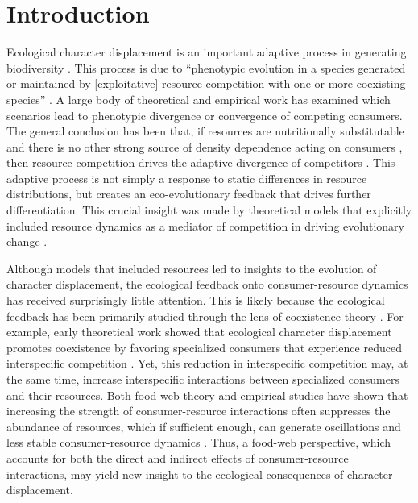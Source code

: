 \documentclass[11pt,]{article}
\begin{document}
\newpage

\section{Introduction}\label{introduction}

Ecological character displacement is an important adaptive process in
generating biodiversity \citep{Schluter2000, Pfennig2010}. This process
is due to ``phenotypic evolution in a species generated or maintained by
{[}exploitative{]} resource competition with one or more coexisting
species'' \citep{Schluter2000}. A large body of theoretical
\citep[e.g.][]{Lawlor1976, Abrams1986, Doebeli1996, Taper1985, McPeek2019}
and empirical \citep[reviewed
in:][]{Schluter2000, Dayan2005, Stuart2013} work has examined which
scenarios lead to phenotypic divergence or convergence of competing
consumers. The general conclusion has been that, if resources are
nutritionally substitutable \citep{Abrams1987, Fox2008} and there is no
other strong source of density dependence acting on consumers
\citep{Abrams1986}, then resource competition drives the adaptive
divergence of competitors \citep{Lawlor1976, Taper1985}. This adaptive
process is not simply a response to static differences in resource
distributions, but creates an eco-evolutionary feedback that drives
further differentiation. This crucial insight was made by theoretical
models that explicitly included resource dynamics as a mediator of
competition in driving evolutionary change
\citep{Lawlor1976, Abrams1986, Taper1985}.

Although models that included resources led to insights to the evolution
of character displacement, the ecological feedback onto
consumer-resource dynamics has received surprisingly little attention.
This is likely because the ecological feedback has been primarily
studied through the lens of coexistence theory
\citep{Lawlor1976, Germain2018, Bassar2017, McPeek2019}. For example,
early theoretical work showed that ecological character displacement
promotes coexistence by favoring specialized consumers that experience
reduced interspecific competition \citep{Lawlor1976}. Yet, this
reduction in interspecific competition may, at the same time, increase
interspecific interactions between specialized consumers and their
resources. Both food-web theory and empirical studies have shown that
increasing the strength of consumer-resource interactions often
suppresses the abundance of resources, which if sufficient enough, can
generate oscillations and less stable consumer-resource dynamics
\citep{Rosenzweig1971, Luckinbill1973, Murdoch2002, Murdoch2003, McCann2011}.
Thus, a food-web perspective, which accounts for both the direct and
indirect effects of consumer-resource interactions, may yield new
insight to the ecological consequences of character displacement.
\end{document}
